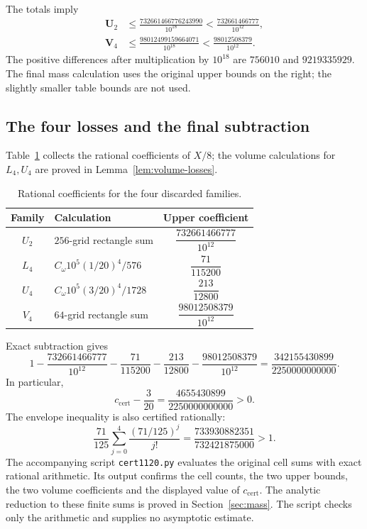 \documentclass{amsart}
\numberwithin{equation}{section}
\numberwithin{table}{section}
\newcommand{\ccert}{c_{\mathrm{cert}}}
\begin{document}
The totals imply
\begin{equation}\label{eq:certificate-comparison}
\begin{aligned}
\mathbf U_2&\le\frac{732661466776243990}{10^{18}}
<\frac{732661466777}{10^{12}},\\
\mathbf V_4&\le\frac{98012499159664071}{10^{18}}
<\frac{98012508379}{10^{12}}.
\end{aligned}
\end{equation}
The positive differences after multiplication by $10^{18}$ are
$756010$ and $9219335929$. The final mass calculation uses the original
upper bounds on the right; the slightly smaller table bounds are not used.

\subsection{The four losses and the final subtraction}

Table~\ref{tab:mass-certificate} collects the rational coefficients of
$X/8$; the volume calculations for $L_4,U_4$ are proved in
Lemma~\ref{lem:volume-losses}.

\begin{table}[htbp]
\caption{Rational coefficients for the four discarded families.}
\label{tab:mass-certificate}
\centering\small
\renewcommand{\arraystretch}{2.45}
\begin{tabular}{@{}clc@{}}
\hline
Family & Calculation & Upper coefficient\\
\hline
$U_2$ & $256$-grid rectangle sum & $\dfrac{732661466777}{10^{12}}$\\
$L_4$ & $C_\omega10^5(1/20)^4/576$ & $\dfrac{71}{115200}$\\
$U_4$ & $C_\omega10^5(3/20)^4/1728$ & $\dfrac{213}{12800}$\\
$V_4$ & $64$-grid rectangle sum & $\dfrac{98012508379}{10^{12}}$\\
\hline
\end{tabular}
\end{table}

Exact subtraction gives
\[
1-\frac{732661466777}{10^{12}}-\frac{71}{115200}
-\frac{213}{12800}-\frac{98012508379}{10^{12}}
=\frac{342155430899}{2250000000000}.
\]
In particular,
\[
\ccert-\frac3{20}
=\frac{4655430899}{2250000000000}>0.
\]
The envelope inequality is also certified rationally:
\[
\frac{71}{125}\sum_{j=0}^4\frac{(71/125)^j}{j!}
=\frac{733930882351}{732421875000}>1.
\]
The accompanying script \texttt{cert1120.py} evaluates the original cell
sums with exact rational arithmetic. Its output confirms the cell counts,
the two upper bounds, the two volume coefficients and the displayed value
of $\ccert$. The analytic reduction to these finite sums is proved in
Section~\ref{sec:mass}. The script checks only the arithmetic and supplies
no asymptotic estimate.
\end{document}
